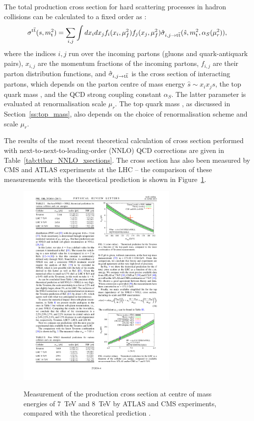 The total \ttbar production cross section for hard scattering processes in hadron collisions can be calculated to a
fixed order as \autocite{Sterman1986, primer_LHC}:
\begin{equation}
\sigma^{\mathrm{t}\overline{\mathrm{t}}} (s,m_\mathrm{t}^2) = \sum_{i,j} \int dx_i dx_j f_i(x_i, \mu_f^2) f_j(x_j,\mu_f^2) \hat{\sigma}_{i,j
\rightarrow \mathrm{t}\overline{\mathrm{t}}} (\hat{s}, m_\mathrm{t}^2, \alpha_S(\mu_r^2)),
\end{equation}
where the indices $i,j$ run over the incoming partons (gluons and quark-antiquark pairs), $x_{i,j}$ are the momentum
fractions of the incoming partons, $f_{i,j}$ are their parton distribution functions, and $\hat{\sigma}_{i,j
\rightarrow \mathrm{t}\overline{\mathrm{t}}}$ is the cross section of interacting partons, which depends on the parton centre of mass energy
$\hat{s} \sim x_i x_j s$, the top quark mass \mtop, and the QCD strong coupling constant $\alpha_S$. The latter
parameter is evaluated at renormalisation scale $\mu_r$. The top quark mass \mtop, as discussed in
Section~\ref{ss:top_mass}, also depends on the choice of renormalisation scheme and scale $\mu_r$.

The results of the most recent theoretical calculation of \ttbar cross section performed with
next-to-next-to-leading-order (NNLO) QCD corrections \autocite{NNLO_ttbar} are given in
Table~\ref{tab:ttbar_NNLO_xsections}. The cross section has also been measured by CMS and ATLAS experiments at the LHC
-- the comparison of these measurements with the theoretical prediction is shown in
Figure~\ref{fig:xsections_comparison_NNLO}.



\begin{figure}[bhtp]
   \centering
   {\includegraphics[width=0.7\textwidth]{xsections_comparison_NNLO}}
   \caption[Measurement of the \ttbar production cross section]{Measurement of the \ttbar production cross section at
   centre of mass energies of \SI{7}{\TeV} and \SI{8}{\TeV} by ATLAS and CMS experiments, compared with the theoretical
   prediction \autocite{NNLO_ttbar}.}
   \label{fig:xsections_comparison_NNLO}
\end{figure}

